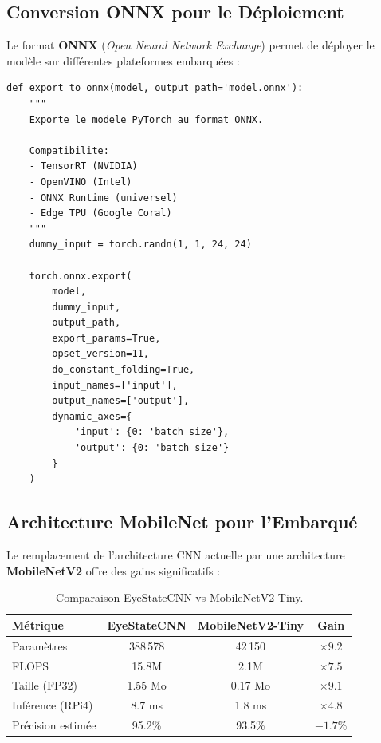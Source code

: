 \documentclass[12pt,a4paper,twoside]{report}
\newcommand{\keyword}[1]{\textbf{\textcolor{stellantisblue}{#1}}}
\begin{document}
\subsection{Conversion ONNX pour le Déploiement}

Le format \keyword{ONNX} (\textit{Open Neural Network Exchange}) permet de déployer le modèle sur différentes plateformes embarquées :

\begin{lstlisting}[style=pythonstyle, caption={Export du modèle au format ONNX.}, label={lst:onnx_export}]
def export_to_onnx(model, output_path='model.onnx'):
    """
    Exporte le modele PyTorch au format ONNX.
    
    Compatibilite:
    - TensorRT (NVIDIA)
    - OpenVINO (Intel)
    - ONNX Runtime (universel)
    - Edge TPU (Google Coral)
    """
    dummy_input = torch.randn(1, 1, 24, 24)
    
    torch.onnx.export(
        model,
        dummy_input,
        output_path,
        export_params=True,
        opset_version=11,
        do_constant_folding=True,
        input_names=['input'],
        output_names=['output'],
        dynamic_axes={
            'input': {0: 'batch_size'},
            'output': {0: 'batch_size'}
        }
    )
\end{lstlisting}

\subsection{Architecture MobileNet pour l'Embarqué}

Le remplacement de l'architecture CNN actuelle par une architecture \keyword{MobileNetV2} \cite{sandler2018} offre des gains significatifs :

\begin{table}[H]
\centering
\caption{Comparaison EyeStateCNN vs MobileNetV2-Tiny.}
\label{tab:mobilenet_comparison}
\renewcommand{\arraystretch}{1.3}
\begin{tabular}{|l|c|c|c|}
\hline
\rowcolor{stellantisblue!15}
\textbf{Métrique} & \textbf{EyeStateCNN} & \textbf{MobileNetV2-Tiny} & \textbf{Gain} \\
\hline
Paramètres & 388\,578 & 42\,150 & $\times 9.2$ \\
\hline
FLOPS & 15.8M & 2.1M & $\times 7.5$ \\
\hline
Taille (FP32) & 1.55 Mo & 0.17 Mo & $\times 9.1$ \\
\hline
Inférence (RPi4) & 8.7 ms & 1.8 ms & $\times 4.8$ \\
\hline
Précision estimée & 95.2\% & 93.5\% & $-1.7\%$ \\
\hline
\end{tabular}
\end{table}
\end{document}
